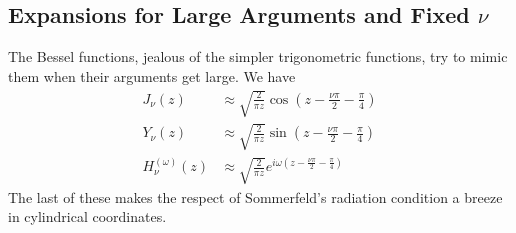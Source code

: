\subsection{Expansions for Large Arguments and Fixed $\nu$}
The Bessel functions, jealous of the simpler trigonometric functions, 
try to mimic them when their arguments get large. We have
  \begin{subequations}
  \begin{align}
   J_\nu(z)		&\approx \sqrt{\frac{2}{\pi z}}\cos\left(z-\frac{\nu\pi}{2}-\frac{\pi}{4}\right)	\\
   Y_\nu(z)		&\approx \sqrt{\frac{2}{\pi z}}\sin\left(z-\frac{\nu\pi}{2}-\frac{\pi}{4}\right)	\\
   H_\nu^{(\omega)}(z)	&\approx \sqrt{\frac{2}{\pi z}}e^{i\omega\left(z-\frac{\nu\pi}{2}-\frac{\pi}{4}\right)}\label{eq:app.Bessel.asymptoticHankel}
  \end{align}
  \end{subequations}
The last of these makes the respect of Sommerfeld's radiation condition a breeze in cylindrical coordinates.